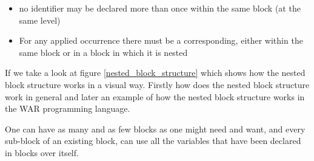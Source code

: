 	\begin{itemize}
	\item no identifier may be declared more than once within the same block (at the same level) %
	\item For any applied occurrence there must be a corresponding, either within the same block or in a block in which it is nested %
	\end{itemize}
	
	
	If we take a look at figure \ref{nested_block_structure} which shows how the nested block structure works in a visual way. Firstly how does the nested block structure work in general and later an example of how the nested block structure works in the WAR programming language.
	
	One can have as many and as few blocks as one might need and want, and every sub-block of an existing block, can use all the variables that have been declared in blocks over itself. 
	
	
		
	 
	
	

\newpage	

	
	
	
